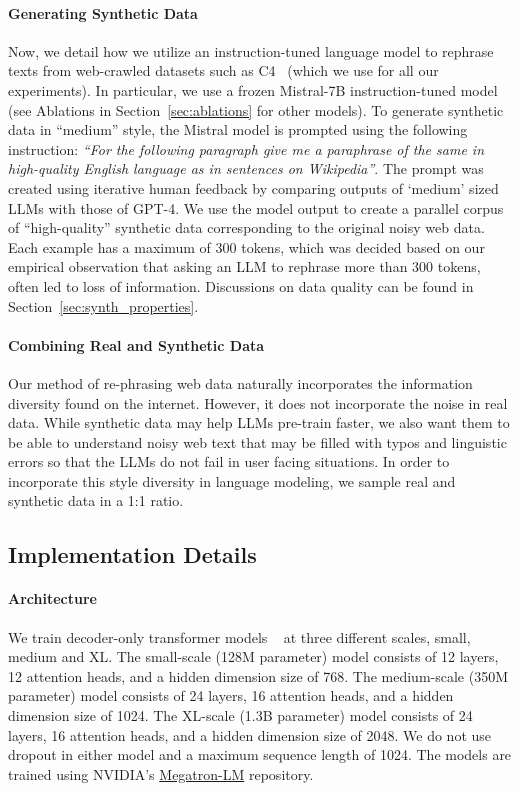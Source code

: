 \paragraph{Generating Synthetic Data}
Now, we detail how we utilize an instruction-tuned language model to rephrase texts from web-crawled datasets such as C4~\citep{raffel2020exploring} (which we use for all our experiments). In particular, we use a frozen Mistral-7B instruction-tuned model~\citep{jiang2023mistral} (see Ablations in Section~\ref{sec:ablations} for other models).
To generate synthetic data in ``medium'' style, the Mistral model is prompted using the following instruction: \emph{``For the following paragraph give me a paraphrase of the same in high-quality English language as in sentences on Wikipedia''}. The prompt was created using iterative human feedback by comparing outputs of `medium' sized LLMs with those of GPT-4.
We use the model output to create a parallel corpus of ``high-quality'' synthetic data corresponding to the original noisy web data. Each example has a maximum of 300 tokens, which was decided based on our empirical observation that asking an LLM to rephrase more than 300 tokens, often led to loss of information. Discussions on data quality can be found in Section~\ref{sec:synth_properties}.
 



\paragraph{Combining Real and Synthetic Data}
Our method of re-phrasing web data naturally incorporates the information diversity found on the internet. However, it does not incorporate the noise 
in real data. While synthetic data may help LLMs pre-train faster, we also want them to be able to understand noisy web text that may be filled with typos and linguistic errors so that the LLMs do not fail in user facing situations. In order to incorporate this style diversity in language modeling, we sample real and synthetic data in a 1:1 ratio. 


\subsection{Implementation Details}
\label{sec:implementation_details}
\paragraph{Architecture}
We train decoder-only transformer models ~\citep{vaswani2017attention} at three different scales, small, medium and XL. 
The small-scale (128M parameter) model consists of 12 layers, 12 attention heads, and a hidden dimension size of 768.
The medium-scale (350M parameter) model consists of 24 layers, 16 attention heads, and a hidden dimension size of 1024.
The XL-scale (1.3B parameter) model consists of 24 layers, 16 attention heads, and a hidden dimension size of 2048.
We do not use dropout in either model and a maximum sequence length of 1024. The models are trained using NVIDIA's \href{https://github.com/NVIDIA/Megatron-LM}{Megatron-LM} repository.


